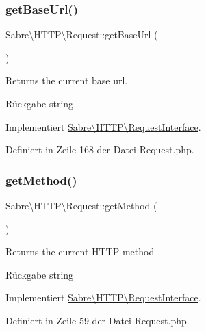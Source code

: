 \subsubsection{\texorpdfstring{get\+Base\+Url()}{getBaseUrl()}}
{\footnotesize\ttfamily Sabre\textbackslash{}\+H\+T\+T\+P\textbackslash{}\+Request\+::get\+Base\+Url (\begin{DoxyParamCaption}{ }\end{DoxyParamCaption})}

Returns the current base url.

\begin{DoxyReturn}{Rückgabe}
string 
\end{DoxyReturn}


Implementiert \mbox{\hyperlink{interface_sabre_1_1_h_t_t_p_1_1_request_interface_af5683bbd6dfff74d91ac4620ae328feb}{Sabre\textbackslash{}\+H\+T\+T\+P\textbackslash{}\+Request\+Interface}}.



Definiert in Zeile 168 der Datei Request.\+php.

\mbox{\label{class_sabre_1_1_h_t_t_p_1_1_request_abdb8452dd585c99e63248dfe22a6d57d}} 
\subsubsection{\texorpdfstring{get\+Method()}{getMethod()}}
{\footnotesize\ttfamily Sabre\textbackslash{}\+H\+T\+T\+P\textbackslash{}\+Request\+::get\+Method (\begin{DoxyParamCaption}{ }\end{DoxyParamCaption})}

Returns the current H\+T\+TP method

\begin{DoxyReturn}{Rückgabe}
string 
\end{DoxyReturn}


Implementiert \mbox{\hyperlink{interface_sabre_1_1_h_t_t_p_1_1_request_interface_a261109b4898971242fccc2097a880131}{Sabre\textbackslash{}\+H\+T\+T\+P\textbackslash{}\+Request\+Interface}}.



Definiert in Zeile 59 der Datei Request.\+php.

\mbox{\label{class_sabre_1_1_h_t_t_p_1_1_request_ab484327e7fcdadc5caca615eeb436cf8}} 
